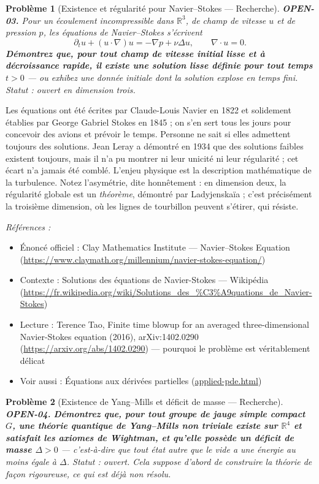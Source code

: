 \documentclass[11pt]{article}
\newtheorem{problem}{Problème}
\newenvironment{refs}{\par\small\noindent\emph{Références :}\begin{itemize}\setlength\itemsep{0pt}}{\end{itemize}\normalsize}
\begin{document}
\bigskip

\begin{problem}[{Existence et régularité pour Navier--Stokes --- Recherche}]
\textbf{OPEN-03.} Pour un écoulement incompressible dans
$ \mathbb{R}^3 $, de champ de vitesse $ u $ et de pression $ p $, les équations de
Navier--Stokes s'écrivent
\[ \partial_t u + (u \cdot \nabla) u = -\nabla p + \nu \Delta u, \qquad \nabla \cdot u = 0 . \]
\textbf{Démontrez que, pour tout champ de vitesse initial lisse et à décroissance rapide, il
existe une solution lisse définie pour tout temps $ t > 0 $} --- ou exhibez une donnée
initiale dont la solution explose en temps fini. Statut : ouvert en dimension trois.
\end{problem}

\noindent Les équations ont été écrites par Claude-Louis Navier en 1822 et
solidement établies par George Gabriel Stokes en 1845 ; on s'en sert tous les jours pour
concevoir des avions et prévoir le temps. Personne ne sait si elles admettent toujours des
solutions. Jean Leray a démontré en 1934 que des solutions faibles existent toujours, mais
il n'a pu montrer ni leur unicité ni leur régularité ; cet écart n'a jamais été comblé.
L'enjeu physique est la description mathématique de la turbulence. Notez l'asymétrie, dite
honnêtement : en dimension deux, la régularité globale est un \textit{théorème}, démontré par
Ladyjenskaïa ; c'est précisément la troisième dimension, où les lignes de tourbillon
peuvent s'étirer, qui résiste.

\begin{refs}
\item Énoncé officiel : Clay Mathematics Institute --- Navier--Stokes Equation (\url{https://www.claymath.org/millennium/navier-stokes-equation/})
\item Contexte : Solutions des équations de Navier-Stokes --- Wikipédia (\url{https://fr.wikipedia.org/wiki/Solutions_des_%C3%A9quations_de_Navier-Stokes})
\item Lecture : Terence Tao, \og{} Finite time blowup for an averaged three-dimensional Navier-Stokes equation \fg{} (2016), arXiv:1402.0290 (\url{https://arxiv.org/abs/1402.0290}) --- pourquoi le problème est véritablement délicat
\item Voir aussi : Équations aux dérivées partielles (\url{applied-pde.html})
\end{refs}

\bigskip

\begin{problem}[{Existence de Yang--Mills et déficit de masse --- Recherche}]
\textbf{OPEN-04.} \textbf{Démontrez que, pour tout groupe de jauge simple
compact $ G $, une théorie quantique de Yang--Mills non triviale existe sur
$ \mathbb{R}^4 $ et satisfait les axiomes de Wightman, et qu'elle possède un déficit de
masse $ \Delta > 0 $} --- c'est-à-dire que tout état autre que le vide a une énergie au
moins égale à $ \Delta $. Statut : ouvert. Cela suppose d'abord de construire la théorie
de façon rigoureuse, ce qui est déjà non résolu.
\end{problem}
\end{document}
